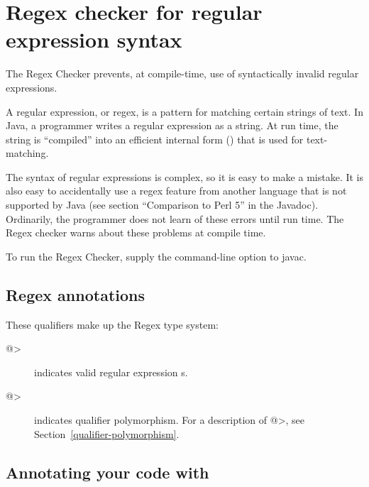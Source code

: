 \htmlhr
\chapter{Regex checker for regular expression syntax\label{regex-checker}}

The Regex Checker prevents, at compile-time, use of syntactically invalid
regular expressions.

A regular expression, or regex, is a pattern for matching certain strings
of text.  In Java, a programmer writes a regular expression as a string.
At run time, the string is ``compiled'' into an efficient internal form
() that is used for
text-matching.

The syntax of regular expressions is complex, so it is easy to make a
mistake.  It is also easy to accidentally use a regex feature from another
language that is not supported by Java (see section ``Comparison to Perl
5'' in the  Javadoc).
Ordinarily, the programmer does not learn of these errors until run time.
The Regex checker warns about these problems at compile time.

To run the Regex Checker, supply the  command-line option to javac.


\section{Regex annotations\label{regex-annotations}}

These qualifiers make up the Regex type system:

\begin{description}

\item[\<@>]
  indicates valid regular expression s.

\item[\<@>]
  indicates qualifier polymorphism. For a description of
  \<@>,
  see Section~\ref{qualifier-polymorphism}.

\end{description}

\section{Annotating your code with \label{annotating-with-regex}}

